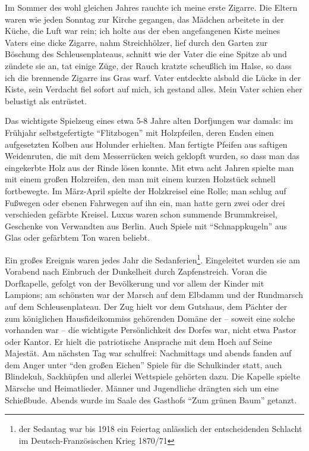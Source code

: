 \documentclass[a5paper,pagesize,10pt,twoside=true]{scrbook}
\begin{document}
Im Sommer des wohl gleichen Jahres rauchte ich meine erste Zigarre. Die Eltern waren wie jeden Sonntag zur Kirche gegangen, das Mädchen arbeitete in der Küche, die Luft war rein; ich holte aus der eben angefangenen Kiste meines Vaters eine dicke Zigarre, nahm Streichhölzer, lief durch den Garten zur Böschung des Schleusenplateaus, schnitt wie der Vater die eine Spitze ab und zündete sie an, tat einige Züge, der Rauch kratzte scheußlich im Halse, so dass ich die brennende Zigarre ins Gras warf. Vater entdeckte alsbald die Lücke in der Kiste, sein Verdacht fiel sofort auf mich, ich gestand alles. Mein Vater schien eher belustigt als entrüstet.

Das wichtigste Spielzeug eines etwa 5-8 Jahre alten Dorfjungen war damals: im Frühjahr selbstgefertigte \enquote{Flitzbogen} mit Holzpfeilen, deren Enden einen aufgesetzten Kolben aus Holunder erhielten. Man fertigte Pfeifen aus saftigen Weidenruten, die mit dem Messerrücken weich geklopft wurden, so dass man das eingekerbte Holz aus der Rinde lösen konnte. Mit etwa acht Jahren spielte man mit einem großen Holzreifen, den man mit einem kurzen Holzstück schnell fortbewegte. Im März-April spielte der Holzkreisel eine Rolle; man schlug auf Fußwegen oder ebenen Fahrwegen auf ihn ein, man hatte gern zwei oder drei verschieden gefärbte Kreisel. Luxus waren schon summende Brummkreisel, Geschenke von Verwandten aus Berlin. Auch Spiele mit \enquote{Schnappkugeln} aus Glas oder gefärbtem Ton waren beliebt.

Ein großes Ereignis waren jedes Jahr die Sedanferien\footnote{der Sedantag war bis 1918 ein Feiertag anlässlich der entscheidenden Schlacht im Deutsch-Französischen Krieg 1870/71}. Eingeleitet wurden sie am Vorabend nach Einbruch der Dunkelheit durch Zapfenstreich. Voran die Dorfkapelle, gefolgt von der Bevölkerung und vor allem der Kinder mit Lampions; am schönsten war der Marsch auf dem Elbdamm und der Rundmarsch auf dem Schleusenplateau. Der Zug hielt vor dem Gutshaus, dem Pächter der zum königlichen Hausfideikommiss gehörenden Domäne der -- soweit eine solche vorhanden war -- die wichtigste Persönlichkeit des Dorfes war, nicht etwa Pastor oder Kantor. Er hielt die patriotische Ansprache mit dem Hoch auf Seine Majestät. Am nächsten Tag war schulfrei: Nachmittags und abends fanden auf dem Anger unter \enquote{den großen Eichen} Spiele für die Schulkinder statt, auch Blindekuh, Sackhüpfen und allerlei Wettspiele gehörten dazu. Die Kapelle spielte Märsche und Heimatlieder. Männer und Jugendliche drängten sich um eine Schießbude. Abends wurde im Saale des Gasthofs \enquote{Zum grünen Baum} getanzt.
\end{document}
